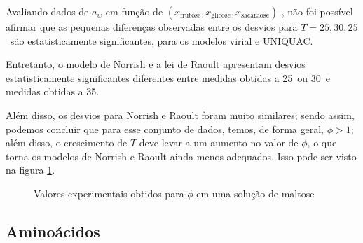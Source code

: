 \documentclass[
	12pt,				%
	openright,
	twoside,
	a4paper,			%
	english,			%
	french,				%
	spanish,			%
	brazil				%
	]{abntex2}
\begin{document}
Avaliando dados de $a_w$ em função de $(x_\text{frutose},x_\text{glicose},%
x_\text{sacaraose})$ \cite{velezmoro2000}, não foi possível afirmar que
as pequenas diferenças observadas entre os desvios para $T=25,30,25$
\textcelsius\ são estatisticamente significantes, para os modelos
virial e UNIQUAC.

Entretanto, o modelo de Norrish e a lei de Raoult apresentam desvios
estatisticamente significantes diferentes entre medidas obtidas a
25\textcelsius\ ou 30\textcelsius\ e medidas obtidas a 35\textcelsius.

Além disso, os desvios para Norrish e Raoult foram muito similares; sendo
assim, podemos concluir que para esse conjunto de dados, temos, de forma
geral, $\phi>1$; além disso, o crescimento de $T$ deve levar a um aumento
no valor de $\phi$, o que torna os modelos de Norrish e Raoult ainda menos
adequados. Isso pode ser visto na figura \ref{fig_temp_carbs}.

\begin{figure}[h]
	\centering
	\caption{Valores experimentais obtidos para $\phi$ em uma solução de maltose}
	\label{fig_temp_carbs}
\end{figure}

\subsection{Aminoácidos}
\end{document}
